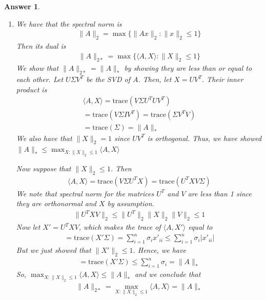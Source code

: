 \documentclass[12pt]{article}
\theoremstyle{colon}
\newtheorem*{answer}{Answer}
\begin{document}
\begin{answer}
  \leavevmode
  \begin{enumerate}[label=\arabic*)]
    \item We have that the spectral norm is
      \begin{gather*}
        \lVert A \rVert_2 = \max \{\lVert A x \rVert_2 : \lVert x \rVert_2 \leq 1 \}
      \end{gather*}
      Then its dual is
      \begin{gather*}
        \lVert A \rVert_{2*} = \max \{ \langle A, X \rangle : \lVert X \rVert_2 \leq 1 \}
      \end{gather*}
      We show that $\lVert A \rVert_{2*} = \lVert A \rVert_*$ by showing they are less than or equal to each other. Let $U \Sigma V^T$ be the SVD of $A$. Then, let $X = U V^T$. Their inner product is
      \begin{gather*}
        \langle A, X \rangle = \text{trace}(V \Sigma U^T U V^T) \\
        = \text{trace}(V \Sigma I V^T) = \text{trace}(\Sigma V^T V) \\
        = \text{trace}(\Sigma) = \lVert A \rVert_*
      \end{gather*}
      We also have that $\lVert X \rVert_2 = 1$ since $U V^T$ is orthogonal. Thus, we have showed $\lVert A \rVert_* \leq \max_{X : \lVert X \rVert_2 \leq 1} \langle A, X \rangle$

      Now suppose that $\lVert X \rVert_2 \leq 1$. Then
      \begin{gather*}
        \langle A, X \rangle = \text{trace}(V \Sigma U^T X) = \text{trace}(U^T X V \Sigma)
      \end{gather*}
      We note that spectral norm for the matrices $U^T$ and $V$ are less than 1 since they are orthonormal and $X$ by assumption.
      \begin{gather*}
        \lVert U^T X V \rVert_2 \leq \lVert U^T \rVert_2 \lVert X \rVert_2 \lVert V \rVert_2 \leq 1
      \end{gather*}
      Now let $X' = U^T X V$, which makes the trace of $\langle A, X' \rangle$ equal to
      \begin{gather*}
        = \text{trace}(X' \Sigma) = \sum_{i=1}^n \sigma_i x'_{ii} \leq \sum_{i=1}^n \sigma_i \lvert x'_{ii} \rvert
      \end{gather*}
      But we just showed that $\lVert X' \rVert_2 \leq 1$. Hence, we have
      \begin{gather*}
        = \text{trace}(X' \Sigma) \leq \sum_{i=1}^n \sigma_i = \lVert A \rVert_*
      \end{gather*}
      So, $\max_{X : \lVert X \rVert_2 \leq 1} \langle A, X \rangle \leq \lVert A \rVert_*$ and we conclude that
      \begin{gather*}
        \lVert A \rVert_{2*} = \max_{X : \lVert X \rVert_2 \leq 1} \langle A, X \rangle = \lVert A \rVert_*
      \end{gather*}


\end{enumerate}
\end{answer}
\end{document}
